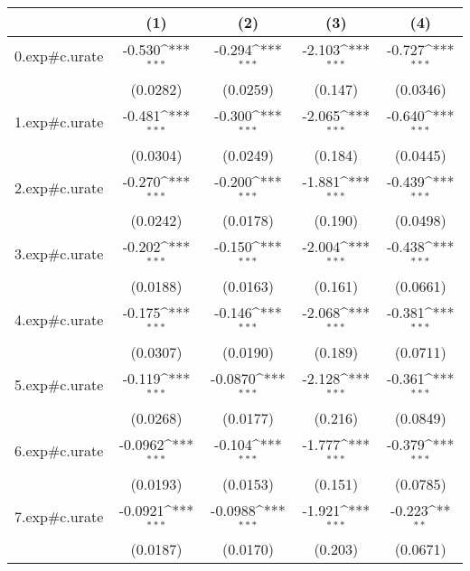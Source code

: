 {
\def\sym#1{\ifmmode^{#1}\else\(^{#1}\)\fi}
\begin{tabular}{l*{4}{c}}
\hline\hline
            &\multicolumn{1}{c}{(1)}&\multicolumn{1}{c}{(2)}&\multicolumn{1}{c}{(3)}&\multicolumn{1}{c}{(4)}\\
\hline
0.exp#c.urate&      -0.530\sym{***}&      -0.294\sym{***}&      -2.103\sym{***}&      -0.727\sym{***}\\
            &    (0.0282)         &    (0.0259)         &     (0.147)         &    (0.0346)         \\
[1em]
1.exp#c.urate&      -0.481\sym{***}&      -0.300\sym{***}&      -2.065\sym{***}&      -0.640\sym{***}\\
            &    (0.0304)         &    (0.0249)         &     (0.184)         &    (0.0445)         \\
[1em]
2.exp#c.urate&      -0.270\sym{***}&      -0.200\sym{***}&      -1.881\sym{***}&      -0.439\sym{***}\\
            &    (0.0242)         &    (0.0178)         &     (0.190)         &    (0.0498)         \\
[1em]
3.exp#c.urate&      -0.202\sym{***}&      -0.150\sym{***}&      -2.004\sym{***}&      -0.438\sym{***}\\
            &    (0.0188)         &    (0.0163)         &     (0.161)         &    (0.0661)         \\
[1em]
4.exp#c.urate&      -0.175\sym{***}&      -0.146\sym{***}&      -2.068\sym{***}&      -0.381\sym{***}\\
            &    (0.0307)         &    (0.0190)         &     (0.189)         &    (0.0711)         \\
[1em]
5.exp#c.urate&      -0.119\sym{***}&     -0.0870\sym{***}&      -2.128\sym{***}&      -0.361\sym{***}\\
            &    (0.0268)         &    (0.0177)         &     (0.216)         &    (0.0849)         \\
[1em]
6.exp#c.urate&     -0.0962\sym{***}&      -0.104\sym{***}&      -1.777\sym{***}&      -0.379\sym{***}\\
            &    (0.0193)         &    (0.0153)         &     (0.151)         &    (0.0785)         \\
[1em]
7.exp#c.urate&     -0.0921\sym{***}&     -0.0988\sym{***}&      -1.921\sym{***}&      -0.223\sym{**} \\
            &    (0.0187)         &    (0.0170)         &     (0.203)         &    (0.0671)         \\

\end{tabular}}
